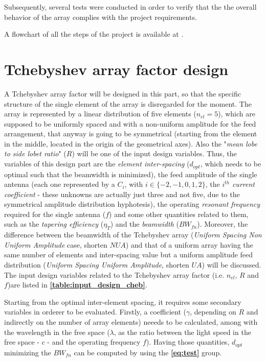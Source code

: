 \documentclass[10 pt,a4paper,twocolumn]{article}
\begin{document}
{Subsequently, several tests were conducted in order to verify that the the overall behavior of the array complies with the project requirements. 

A flowchart of all the steps of the project is available at \pageref{fig:flowchart_2}.

	
\section*{Tchebyshev array factor design}

\indent A Tchebyshev array factor will be designed in this part, so that the specific structure of the single element of the array is disregarded for the moment. The array is represented by a linear distribution of five elements ($n_{el}=5$), which are supposed to be uniformly spaced and with a non-uniform amplitude for the feed arrangement, that anyway is going to be symmetrical (starting from the element in the middle, located in the origin of the geometrical axes). Also the "\emph{mean lobe to side lobet ratio}" ($R$) will be one of the input design variables. Thus, the variables of this design part are the \emph{element inter-spacing} ($d_{opt}$, which needs to be optimal such that the beamwidth is minimized), the feed amplitude of the single antenna (each one represented by a $C_i$, with $i\in\{-2,-1,0,1,2\}$, the $i^{th}$ \emph{current coefficient} - these unknowns are actually just three and not five, due to the symmetrical amplitude distribution hyphotesis), the operating \emph{resonant frequency} required for the single antenna ($f$) and some other quantities related to them, such as the \emph{tapering efficiency} ($\eta_T$) and the \emph{beamwidth} ($BW_{fn}$). Moreover, the difference between the beamwidth of the Tchebyshev array (\emph{Uniform Spacing Non Uniform Amplitude} case, shorten $NUA$) and  that of a uniform array having the same number of elements and inter-spacing value but a uniform amplitude feed distribution  (\emph{Uniform Spacing Uniform Amplitude}, shorten $UA$) will be discussed. The input design variables related to the Tchebyshev array factor (i.e. $n_{el}$, $R$ and $f$)are listed in \textbf{\cref{table:input_design_cheb}}. 

\indent 

Starting from the optimal inter-element spacing, it requires some secondary variables in orderer to be evaluated. Firstly, a coefficient ($\gamma$, depending on $R$ and indirectly on the number of array elements) neeeds to be calculated, among with the wavelength in the free space ($\lambda$, as the ratio between the light speed in the free space - $c$ - and the operating frequency $f$). Having those quantities, $d_{opt}$ minimizing the $BW_{fn}$ can be computed by using the \textbf{\cref{eq:test}} group. 




}
\end{document}
